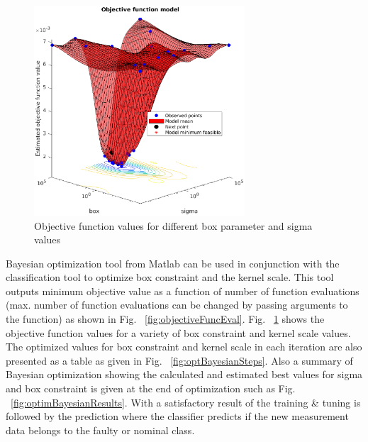 \begin{figure}
\begin{center}
\includegraphics[width=0.7\textwidth]{figures/objFuncModel}    %
\caption{Objective function values for different box parameter and sigma values} 
\label{fig:objFuncModel}
\end{center}
\end{figure}


Bayesian optimization tool from Matlab can be used in conjunction with the classification tool to optimize box constraint and the kernel scale. 
This tool outputs minimum objective value as a function of number of function evaluations (max. number of function evaluations can be changed by passing arguments to the function) as shown in Fig. ~\ref{fig:objectiveFuncEval}. 
Fig. ~\ref{fig:objFuncModel} shows the objective function values for a variety of box constraint and kernel scale values. 
The optimized values for box constraint and kernel scale in each iteration are also presented as a table as given in Fig. ~\ref{fig:optBayesianSteps}. 
Also a summary of Bayesian optimization showing the calculated and estimated best values for sigma and box constraint is given at the end of optimization such as Fig. ~\ref{fig:optimBayesianResults}.
With a satisfactory result of the training \& tuning is followed by the prediction where the classifier predicts if the new measurement data belongs to the faulty or nominal class. 

